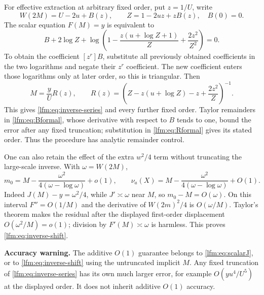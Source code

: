 \documentclass[11pt,letterpaper]{article}
\theoremstyle{remark}\newtheorem{remark}[theorem]{Remark}
\begin{document}
For effective extraction at arbitrary fixed order, put $z=1/U$, write
\[
 W(2M)=U-2u+B(z),\qquad Z=1-2uz+zB(z),\quad B(0)=0.
\]
The scalar equation $F(M)=y$ is equivalent to
\begin{equation}
 B+2\log Z+
 \log\left(1-\frac{z(u+\log Z+1)}Z+\frac{2z^2}{Z^2}\right)=0.\label{lfm:eq:Bformal}
\end{equation}
To obtain the coefficient $[z^r]B$, substitute all previously obtained coefficients in the two logarithms and negate their $z^r$ coefficient. The new coefficient enters those logarithms only at later order, so this is triangular. Then
\begin{equation}
 M=\frac yU R(z),\qquad
 R(z)=\left(Z-z(u+\log Z)-z+\frac{2z^2}Z\right)^{-1}.\label{lfm:eq:Rformal}
\end{equation}
This gives \eqref{lfm:eq:inverse-series} and every further fixed order. Taylor remainders in \eqref{lfm:eq:Bformal}, whose derivative with respect to $B$ tends to one, bound the error after any fixed truncation; substitution in \eqref{lfm:eq:Rformal} gives its stated order. Thus the procedure has analytic remainder control.

One can also retain the effect of the extra $w^2/4$ term without truncating the large-scale inverse. With $\omega=W(2M)$,
\begin{equation}
 m_0=M-\frac{\omega^2}{4(\omega-\log\omega)}+o(1),\qquad
 \nu_a(X)=M-\frac{\omega^2}{4(\omega-\log\omega)}+O(1).\label{lfm:eq:inverse-shift}
\end{equation}
Indeed $J(M)-y=\omega^2/4$, while $J'\asymp\omega$ near $M$, so $m_0-M=O(\omega)$. On this interval $F''=O(1/M)$ and the derivative of $W(2m)^2/4$ is $O(\omega/M)$. Taylor's theorem makes the residual after the displayed first-order displacement $O(\omega^2/M)=o(1)$; division by $F'(M)\asymp\omega$ is harmless. This proves \eqref{lfm:eq:inverse-shift}.

\textbf{Accuracy warning.} The additive $O(1)$ guarantee belongs to \eqref{lfm:eq:scalarJ}, or to \eqref{lfm:eq:inverse-shift} using the untruncated implicit $M$. Any fixed truncation of \eqref{lfm:eq:inverse-series} has its own much larger error, for example $O(yu^4/U^5)$ at the displayed order. It does not inherit additive $O(1)$ accuracy.
\end{document}
